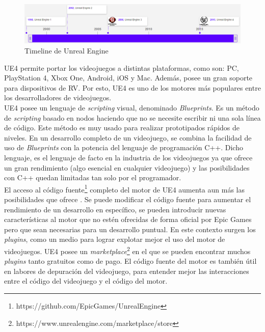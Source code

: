 \begin{figure}[h]
\centering
\includegraphics[width=15cm]{./images/timeline.png}
\caption{Timeline de Unreal Engine}
\end{figure}

\acs{UE4} permite portar los videojuegos a distintas plataformas, como son: PC, PlayStation 4, Xbox One, Android, iOS y Mac. Además, posee un gran soporte para dispositivos de \ac{RV}. Por esto, \acs{UE4} es uno de los motores más populares entre los desarrolladores de videojuegos. \\


\acs{UE4} posee un lenguaje de \textit{scripting} visual, denominado \textit{Blueprints}. Es un método de \textit{scripting} basado en nodos haciendo que no se necesite escribir ni una sola línea de código. Este método es muy usado para realizar prototipados rápidos de niveles. En un desarrollo completo de un videojuego, se combina la facilidad de uso de \textit{Blueprints} con la potencia del lenguaje de programación C++. Dicho lenguaje, es el lenguaje de facto en la industria de los videojuegos ya que ofrece un gran rendimiento (algo esencial en cualquier videojuego) y las posibilidades con C++ quedan limitadas tan solo por el programador.\\


El acceso al código fuente\footnote{https://github.com/EpicGames/UnrealEngine} completo del motor de \acs{UE4} aumenta aun más las posibilidades que ofrece \cite{6}. Se puede modificar el código fuente para aumentar el rendimiento de un desarrollo en específico, se pueden introducir nuevas características al motor que no estén ofrecidas de forma oficial por Epic Games pero que sean necesarias para un desarrollo puntual. En este contexto surgen los \textit{plugins}, como un medio para lograr explotar mejor el uso del motor de videojuegos. \acs{UE4} posee un \textit{marketplace}\footnote{https://www.unrealengine.com/marketplace/store} en el que se pueden encontrar muchos \textit{plugins} tanto gratuitos como de pago. El código fuente del motor es también útil en labores de depuración del videojuego, para entender mejor las interacciones entre el código del videojuego y el código del motor.\\


